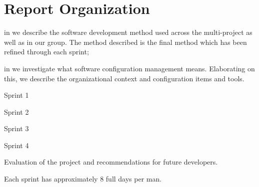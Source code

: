 \section{Report Organization}
\begin{documentorganization}
    \item in  we describe the software development method used across the multi-project as well as in our group. The method described is the final method which has been refined through each sprint;
    \item in  we investigate what software configuration management means. Elaborating on this, we describe the organizational context and configuration items and tools.
    \item Sprint 1
    \item Sprint 2
    \item Sprint 3
    \item Sprint 4
    \item Evaluation of the project and recommendations for future developers. 
\end{documentorganization}


Each sprint has approximately 8 full days per man.